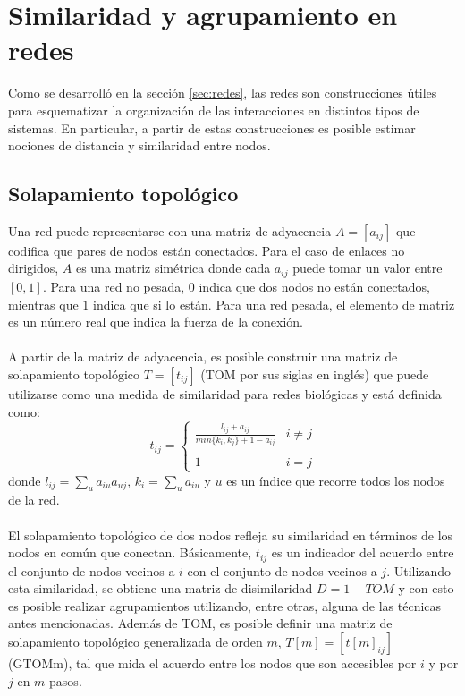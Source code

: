 \section{Similaridad y agrupamiento en redes}
Como se desarrolló en la sección \ref{sec:redes}, las redes son construcciones útiles para esquematizar la organización de las interacciones en distintos tipos de sistemas. En particular, a partir de estas construcciones es posible estimar nociones de distancia y similaridad entre nodos. 
\subsection{Solapamiento topológico}
Una red puede representarse con una matriz de adyacencia $A=[a_{ij}]$ que codifica que pares de nodos están conectados. Para el caso de enlaces no dirigidos, $A$ es una matriz simétrica donde cada $a_{ij}$ puede tomar un valor entre $[0, 1]$. Para una red no pesada, $0$ indica que dos nodos no están conectados, mientras que $1$ indica que si lo están. Para una red pesada, el elemento de matriz es un número real que indica la fuerza de la conexión.\\\\
A partir de la matriz de adyacencia, es posible construir una matriz de solapamiento topológico $T = [t_{ij}]$ (TOM por sus siglas en inglés) que puede utilizarse como una medida de similaridad para redes biológicas y está definida como:
\begin{equation}
t_{ij} = \begin{cases} 
      \frac{l_{ij}+a_{ij}}{min\{k_i,k_j\}+1-a_{ij}} & i\neq j \\\\
      1 & i=j 
\end{cases}
\end{equation}
donde $l_{ij} = \sum\limits_u a_{iu}a_{uj}$, $k_i = \sum\limits_u a_{iu}$ y $u$ es un índice que recorre todos los nodos de la red.\\\\
El solapamiento topológico de dos nodos refleja su similaridad en términos de los nodos en común que conectan. Básicamente, $t_{ij}$ es un indicador del acuerdo entre el conjunto de nodos vecinos a $i$ con el conjunto de nodos vecinos a $j$. Utilizando esta similaridad, se obtiene una matriz de disimilaridad $D = 1-TOM$ y con esto es posible realizar agrupamientos utilizando, entre otras, alguna de las técnicas antes mencionadas. Además de TOM, es posible definir una matriz de solapamiento topológico generalizada de orden $m$, $T[m] = [t[m]_{ij}]$ (GTOMm), tal que mida el acuerdo entre los nodos que son accesibles por $i$ y por $j$ en $m$ pasos.\cite{Horvath2007}\\\\
